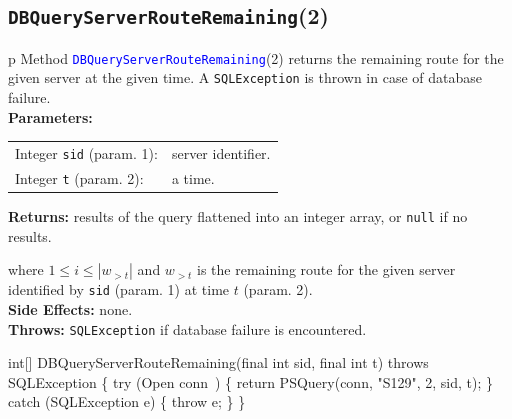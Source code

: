 \subsection{\texttt{DBQueryServerRouteRemaining}(2)}
\begin{tabular}{p{\textwidth}}
\toprule
{}
Method \textcolor{blue}{{\tt{}\protect{}DBQueryServerRouteRemaining}}(2) returns the
remaining route for the given server at the given time.
A {\tt{}SQLException} is thrown in case of database failure.\\
\midrule
\textbf{Parameters:} \\
\begin{tabular}{lp{116mm}}
Integer {\tt{}sid} (param. 1):&server identifier.\\
Integer {\tt{}t} (param. 2):&a time.\\
\end{tabular}
\textbf{Returns:} results of the query flattened into an integer array,
or {\tt{}null} if no results.


where $1\leq i\leq |w_{>t}|$ and $w_{>t}$ is the remaining route for the
given server identified by {\tt{}sid} (param. 1) at time $t$ (param. 2).\\
\textbf{Side Effects:} none.\\
\textbf{Throws:} {\tt{}SQLException} if database failure is encountered.\\
\bottomrule
\end{tabular}
\nwenddocs{}\endmoddef{}
int[] DBQueryServerRouteRemaining(final int sid, final int t) throws SQLException \{
  try (\LA{}Open \code{}conn\edoc{}~{\nwtagstyle{}}\RA{}) \{
    return PSQuery(conn, "S129", 2, sid, t);
  \} catch (SQLException e) \{
    throw e;
  \}
\}
\eatline
